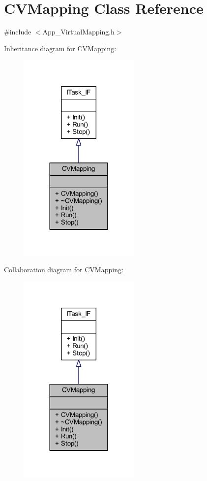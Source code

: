 \hypertarget{class_c_v_mapping}{}\section{C\+V\+Mapping Class Reference}
\label{class_c_v_mapping}


{\ttfamily \#include $<$App\+\_\+\+Virtual\+Mapping.\+h$>$}



Inheritance diagram for C\+V\+Mapping\+:\nopagebreak
\begin{figure}[H]
\begin{center}
\leavevmode
\includegraphics[width=168pt]{class_c_v_mapping__inherit__graph}
\end{center}
\end{figure}


Collaboration diagram for C\+V\+Mapping\+:\nopagebreak
\begin{figure}[H]
\begin{center}
\leavevmode
\includegraphics[width=168pt]{class_c_v_mapping__coll__graph}
\end{center}
\end{figure}
